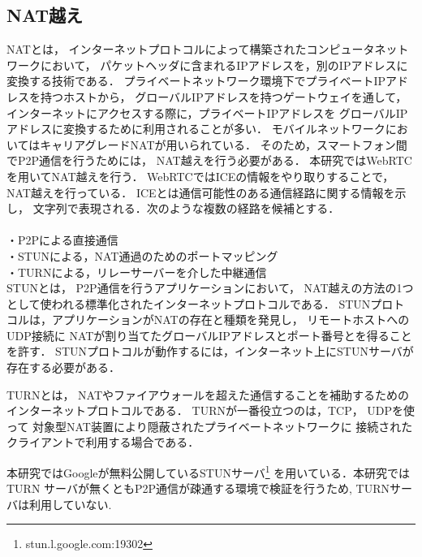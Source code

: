 \documentclass[sotsuron]{jcsie}
\begin{document}
\subsection{NAT越え}
NATとは，
インターネットプロトコルによって構築されたコンピュータネットワークにおいて，
パケットヘッダに含まれるIPアドレスを，別のIPアドレスに変換する技術である．
プライベートネットワーク環境下でプライベートIPアドレスを持つホストから，
グローバルIPアドレスを持つゲートウェイを通して，
インターネットにアクセスする際に，プライベートIPアドレスを
グローバルIPアドレスに変換するために利用されることが多い．
モバイルネットワークにおいてはキャリアグレードNATが用いられている．
そのため，スマートフォン間でP2P通信を行うためには，
NAT越えを行う必要がある．
本研究ではWebRTCを用いてNAT越えを行う．
WebRTCではICEの情報をやり取りすることで，NAT越えを行っている．
ICEとは通信可能性のある通信経路に関する情報を示し，
文字列で表現される．次のような複数の経路を候補とする．
\\\\
・P2Pによる直接通信\\
・STUNによる，NAT通過のためのポートマッピング\\
・TURNによる，リレーサーバーを介した中継通信\\

STUN\cite{wing2008session}とは，
P2P通信を行うアプリケーションにおいて，
NAT越えの方法の1つとして使われる標準化されたインターネットプロトコルである．
STUNプロトコルは，アプリケーションがNATの存在と種類を発見し，
リモートホストへのUDP接続に
NATが割り当てたグローバルIPアドレスとポート番号とを得ることを許す．
STUNプロトコルが動作するには，インターネット上にSTUNサーバが存在する必要がある．

TURN\cite{matthews2010traversal}とは，
NATやファイアウォールを超えた通信することを補助するための
インターネットプロトコルである．
TURNが一番役立つのは，TCP， UDPを使って
対象型NAT装置により隠蔽されたプライベートネットワークに
接続されたクライアントで利用する場合である．

本研究ではGoogleが無料公開しているSTUNサーバ\footnote{stun.l.google.com:19302}
を用いている．本研究ではTURN
サーバが無くともP2P通信が疎通する環境で検証を行うため, 
TURNサーバは利用していない.
\end{document}

